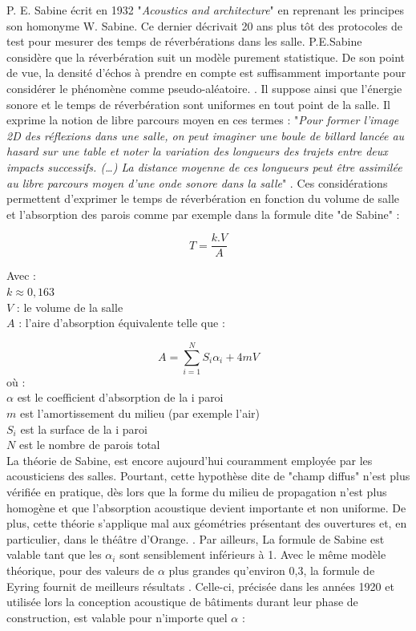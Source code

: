 P. E. Sabine écrit en 1932 "\textit{Acoustics and architecture}" en reprenant les principes son homonyme W. Sabine. Ce dernier décrivait 20 ans plus tôt des protocoles de test pour mesurer des temps de réverbérations dans les salle. P.E.Sabine considère que la réverbération suit un modèle purement statistique. De son point de vue, la densité d'échos à prendre en compte est suffisamment importante pour considérer le phénomène comme pseudo-aléatoire. \cite[p. 19]{Kandelman}. Il suppose ainsi que l’énergie sonore et le temps de réverbération sont uniformes en tout point de la salle. Il exprime la notion de libre parcours moyen en ces termes : "\textit{Pour former l’image 2D des réflexions dans une salle, on peut imaginer une boule de billard lancée au hasard sur une table et noter la variation des longueurs des trajets entre deux impacts successifs. (…) La distance moyenne de ces longueurs peut être assimilée au libre parcours moyen d’une onde sonore dans la salle}" \cite[]{sabine2}. Ces considérations permettent d'exprimer le temps de réverbération en fonction du volume de salle et l'absorption des parois comme par exemple dans la formule dite "de Sabine" : 

\begin{equation}
   	T = \frac{k.V}{A}
\end{equation}

Avec : \\
$k \approx 0,163$ \\
$V$ : le volume de la salle\\
$A$ : l'aire d'absorption équivalente telle que : 

\begin{equation}
   	A = \sum_{i=1}^N S_{i}\alpha_{i} + 4mV
\end{equation}
où : \\
$\alpha$ est le coefficient d'absorption de la i paroi \\
$m$ est l'amortissement du milieu (par exemple l'air) \\
$S_{i}$ est la surface de la i paroi \\
$N$ est le nombre de parois total \\

La théorie de Sabine, est encore aujourd'hui couramment employée par les acousticiens des salles. Pourtant, cette hypothèse dite de "champ diffus" n’est plus vérifiée en pratique, dès lors que la forme du milieu de propagation n’est plus homogène et que l’absorption acoustique devient importante et non uniforme. De plus, cette théorie s’applique mal aux géométries présentant des ouvertures et, en particulier, dans le théâtre d'Orange. \cite[p. 60]{picaut}. Par ailleurs, La formule de Sabine est valable tant que les $\alpha_i$ sont sensiblement inférieurs à 1. Avec le même modèle théorique, pour des valeurs de $\alpha$ plus grandes qu'environ 0,3, la formule de Eyring fournit de meilleurs résultats \cite[p. 217-241]{eyring}. Celle-ci, précisée dans les années 1920 et utilisée lors la conception acoustique de bâtiments durant leur phase de construction, est valable pour n'importe quel $\alpha$ :

